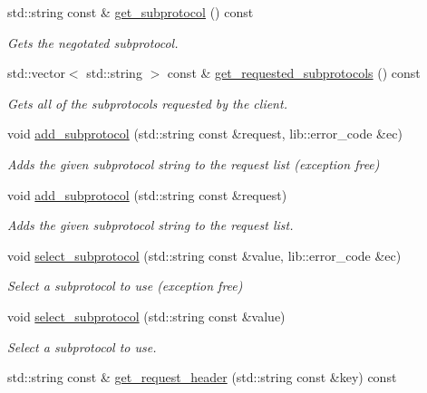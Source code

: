 \begin{DoxyCompactItemize}
std\+::string const \& \hyperlink{classwebsocketpp_1_1connection_adfdf4e89adc7ba3d1239b7e5ae66b818}{get\+\_\+subprotocol} () const 
\begin{DoxyCompactList}\small\item\em Gets the negotated subprotocol. \end{DoxyCompactList}\item 
std\+::vector$<$ std\+::string $>$ const \& \hyperlink{classwebsocketpp_1_1connection_aa5e8f75b832d166eab145b862fd5f637}{get\+\_\+requested\+\_\+subprotocols} () const 
\begin{DoxyCompactList}\small\item\em Gets all of the subprotocols requested by the client. \end{DoxyCompactList}\item 
void \hyperlink{classwebsocketpp_1_1connection_a36462b406f973e16d3107e786c6b9172}{add\+\_\+subprotocol} (std\+::string const \&request, lib\+::error\+\_\+code \&ec)
\begin{DoxyCompactList}\small\item\em Adds the given subprotocol string to the request list (exception free) \end{DoxyCompactList}\item 
void \hyperlink{classwebsocketpp_1_1connection_a37a41672dd87714eb045fd989f98cd26}{add\+\_\+subprotocol} (std\+::string const \&request)
\begin{DoxyCompactList}\small\item\em Adds the given subprotocol string to the request list. \end{DoxyCompactList}\item 
void \hyperlink{classwebsocketpp_1_1connection_a53e9587a711e543ed353e8ecec13d44c}{select\+\_\+subprotocol} (std\+::string const \&value, lib\+::error\+\_\+code \&ec)
\begin{DoxyCompactList}\small\item\em Select a subprotocol to use (exception free) \end{DoxyCompactList}\item 
void \hyperlink{classwebsocketpp_1_1connection_a96b37fbab88dfb78b1641c0c30710243}{select\+\_\+subprotocol} (std\+::string const \&value)
\begin{DoxyCompactList}\small\item\em Select a subprotocol to use. \end{DoxyCompactList}\item 
std\+::string const \& \hyperlink{classwebsocketpp_1_1connection_a3328d3f125c55c1d21034c701fabe04f}{get\+\_\+request\+\_\+header} (std\+::string const \&key) const 

\end{DoxyCompactItemize}
